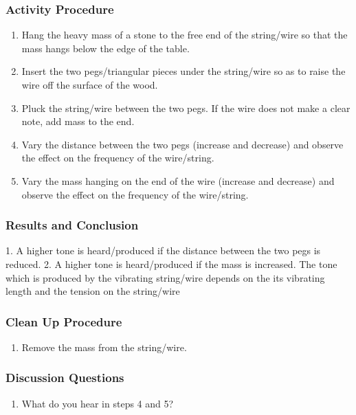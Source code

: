 \subsubsection*{Activity Procedure}
\begin{enumerate}
\item{Hang the heavy mass of a stone to the free end of the string/wire so that the mass hangs below the edge of the table.} 
\item{Insert the two pegs/triangular pieces under the string/wire so as to raise the wire off the surface of the wood.} 
\item{Pluck the string/wire between the two pegs. If the wire does not make a clear note, add mass to the end.} 
\item{Vary the distance between the two pegs (increase and decrease) and observe the effect on the frequency of the wire/string.} 
\item{Vary the mass hanging on the end of the wire (increase and decrease) and observe the effect on the frequency of the wire/string.} 
\end{enumerate}

\subsubsection*{Results and Conclusion}
1. A higher tone is heard/produced if the distance between the two pegs is reduced.  
2. A higher tone is heard/produced if the mass is increased.  
The tone which is produced by the vibrating string/wire depends on the its vibrating length and the tension on the string/wire

\subsubsection*{Clean Up Procedure}
\begin{enumerate}
\item{Remove the mass from the string/wire.} 
\end{enumerate}

\subsubsection*{Discussion Questions}
\begin{enumerate}
\item{What do you hear in steps 4 and 5?}
\end{enumerate}

